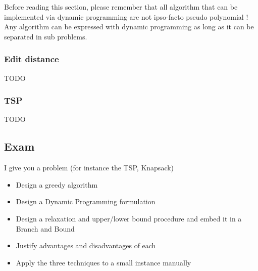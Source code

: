 Before reading this section, please remember that all algorithm that can be
implemented via dynamic programming are not ipso-facto pseudo polynomial ! Any
algorithm can be expressed with dynamic programming as long as it can be separated in
sub problems.

\subsubsection{Edit distance}


TODO

\subsubsection{TSP}
 
TODO



\subsection{Exam}
I give you a problem (for instance the TSP, Knapsack)
\begin{itemize}
    \item  Design a greedy algorithm
    \item  Design a Dynamic Programming formulation
    \item  Design a relaxation and upper/lower bound
        procedure and embed it in a Branch and Bound
    \item  Justify advantages and disadvantages of each
    \item  Apply the three techniques to a small instance
        manually
\end{itemize}
